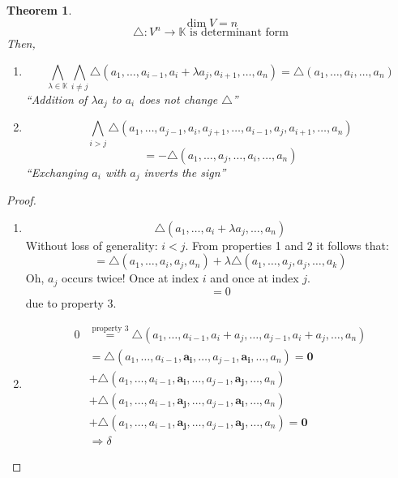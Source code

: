 \documentclass[a4paper,landscape,twocolumn]{article}
\newtheorem{theorem}{Theorem}
\begin{document}
\begin{theorem}
  \label{thm-7.7}
  \[ \dim{V} = n \]
  \[ \triangle: V^n \to \mathbb K \text{ is determinant form} \]
  Then,
  \begin{enumerate}
    \item[4.]
      \[
        \bigwedge_{\lambda \in \mathbb K} \bigwedge_{i \neq j}
        \triangle(a_1, \ldots, a_{i-1}, a_{i} + \lambda a_j, a_{i+1}, \ldots, a_n)
        = \triangle(a_1, \ldots, a_i, \ldots, a_n)
      \]
      \enquote{Addition of $\lambda a_j$ to $a_i$ does not change $\triangle$}
    \item[5.]
      \[
        \bigwedge_{i>j} \triangle(a_1, \ldots, a_{j-1}, a_i, a_{j+1}, \ldots, a_{i-1}, a_j, a_{i+1}, \ldots, a_n)
      \] \[
        = -\triangle (a_1, \ldots, a_j, \ldots, a_i, \ldots, a_n)
      \]
      \enquote{Exchanging $a_i$ with $a_j$ inverts the sign}
  \end{enumerate}
\end{theorem}
\begin{proof}
  \begin{enumerate}
    \item[4.]
      \[
        \triangle(a_1, \ldots, a_i + \lambda a_j, \ldots, a_n)
      \]
      Without loss of generality: $i < j$.
      From properties 1 and 2 it follows that:
      \[
        = \triangle (a_1, \ldots, a_i, a_j, a_n)
        + \lambda \triangle(a_1, \ldots, a_j, a_j, \ldots, a_k)
      \]
      Oh, $a_j$ occurs twice! Once at index $i$ and once at index $j$.
      \[ = 0 \]
      due to property 3.
    \item[5.]
      \begin{align*}
        0 &\stackrel{\text{property~3}}= \triangle (a_1, \ldots, a_{i-1}, a_i + a_j, \ldots, a_{j-1}, a_i + a_j, \ldots, a_n) \\
          &= \triangle(a_1, \ldots, a_{i-1}, \mathbf{a_i}, \ldots, a_{j-1}, \mathbf{a_i}, \ldots, a_n) \mathbf{= 0} \\
          &+ \triangle(a_1, \ldots, a_{i-1}, \mathbf{a_i}, \ldots, a_{j-1}, \mathbf{a_j}, \ldots, a_n) \\
          &+ \triangle(a_1, \ldots, a_{i-1}, \mathbf{a_j}, \ldots, a_{j-1}, \mathbf{a_i}, \ldots, a_n) \\
          &+ \triangle(a_1, \ldots, a_{i-1}, \mathbf{a_j}, \ldots, a_{j-1}, \mathbf{a_j}, \ldots, a_n) \mathbf{= 0} \\
          &\Rightarrow \delta
      \end{align*}
  \end{enumerate}
\end{proof}
\end{document}
